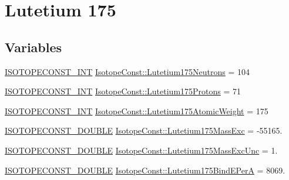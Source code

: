 \hypertarget{group___isotope_const-_lutetium-_lu175}{}\section{Lutetium 175}
\label{group___isotope_const-_lutetium-_lu175}
\subsection*{Variables}
\begin{DoxyCompactItemize}
\item 
\mbox{\hyperlink{group___isotope_const-_macros_ga5f18360b3e99483a35c32d789e62621c}{I\+S\+O\+T\+O\+P\+E\+C\+O\+N\+S\+T\+\_\+\+I\+NT}} \mbox{\hyperlink{group___isotope_const-_lutetium-_lu175_ga76e624f217df1badbb8f58d0041695fc}{Isotope\+Const\+::\+Lutetium175\+Neutrons}} = 104
\item 
\mbox{\hyperlink{group___isotope_const-_macros_ga5f18360b3e99483a35c32d789e62621c}{I\+S\+O\+T\+O\+P\+E\+C\+O\+N\+S\+T\+\_\+\+I\+NT}} \mbox{\hyperlink{group___isotope_const-_lutetium-_lu175_ga2897a010304ca70bb0c37d1bfe7eae28}{Isotope\+Const\+::\+Lutetium175\+Protons}} = 71
\item 
\mbox{\hyperlink{group___isotope_const-_macros_ga5f18360b3e99483a35c32d789e62621c}{I\+S\+O\+T\+O\+P\+E\+C\+O\+N\+S\+T\+\_\+\+I\+NT}} \mbox{\hyperlink{group___isotope_const-_lutetium-_lu175_gae6c8ba4afd3e898547f9ba0ba2f6a3c2}{Isotope\+Const\+::\+Lutetium175\+Atomic\+Weight}} = 175
\item 
\mbox{\hyperlink{group___isotope_const-_macros_ga8f45a7272ce02c0b4c65c44636ed719a}{I\+S\+O\+T\+O\+P\+E\+C\+O\+N\+S\+T\+\_\+\+D\+O\+U\+B\+LE}} \mbox{\hyperlink{group___isotope_const-_lutetium-_lu175_ga252c755514ac66a3236f99684e420aa1}{Isotope\+Const\+::\+Lutetium175\+Mass\+Exc}} = -\/55165.
\item 
\mbox{\hyperlink{group___isotope_const-_macros_ga8f45a7272ce02c0b4c65c44636ed719a}{I\+S\+O\+T\+O\+P\+E\+C\+O\+N\+S\+T\+\_\+\+D\+O\+U\+B\+LE}} \mbox{\hyperlink{group___isotope_const-_lutetium-_lu175_ga30bba88da8e61c384740587c397efc95}{Isotope\+Const\+::\+Lutetium175\+Mass\+Exc\+Unc}} = 1.
\item 
\mbox{\hyperlink{group___isotope_const-_macros_ga8f45a7272ce02c0b4c65c44636ed719a}{I\+S\+O\+T\+O\+P\+E\+C\+O\+N\+S\+T\+\_\+\+D\+O\+U\+B\+LE}} \mbox{\hyperlink{group___isotope_const-_lutetium-_lu175_ga090e572a8dc9c0aedf74e4ffb76c1dd8}{Isotope\+Const\+::\+Lutetium175\+Bind\+E\+PerA}} = 8069.
\item 

\end{DoxyCompactItemize}

